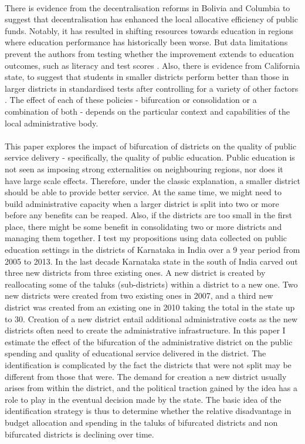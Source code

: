 \documentclass[12pt, a4paper]{article}
\begin{document}
\paragraph{} There is evidence from the decentralisation reforms in Bolivia and Columbia to suggest that decentralisation has enhanced the local allocative efficiency of public funds. Notably, it has resulted in shifting resources towards education in regions where education performance has historically been worse. But data limitations prevent the authors from testing whether the improvement extends to education outcomes, such as literacy and test scores \parencite{faguet2008decentralization}. Also, there is evidence from California state, to suggest that students in smaller districts perform better than those in larger districts in standardised tests after controlling for a variety of other factors \parencite{driscoll2003school}. The effect of each of these policies - bifurcation or consolidation or a combination of both - depends on the particular context and capabilities of the local administrative body. 
\paragraph{}This paper explores the impact of bifurcation of districts on the quality of public service delivery - specifically, the quality of public education. Public education is not seen as imposing strong externalities on neighbouring regions, nor does it have large scale effects. Therefore, under the classic explanation, a smaller district should be able to provide better service. At the same time, we might need to build administrative capacity when a larger district is split into two or more before any benefits can be reaped. Also, if the districts are too small in the first place, there might be some benefit in consolidating two or more districts and managing them together. I test my propositions using data collected on public education settings in the districts of Karnataka in India over a 9 year period from 2005 to 2013. In the last decade Karnataka state in the south of India carved out three new districts from three existing ones. A new district is created by reallocating some of the taluks (sub-districts) within a district to a new one. Two new districts were created from two existing ones in 2007, and a third new district was created from an existing one in 2010 taking the total in the state up to 30. Creation of a new district entail additional administrative costs as the new districts often need to create the administrative infrastructure. In this paper I estimate the effect of the bifurcation of the administrative district on the public spending and quality of educational service delivered in the district. The identification is complicated by the fact the districts that were not split may be different from those that were. The demand for creation a new district usually arises from within the district, and the political traction gained by the idea has a role to play in the eventual decision made by the state. The basic idea of the identification strategy is thus to determine whether the relative disadvantage in budget allocation and spending in the taluks of bifurcated districts and non bifurcated districts is declining over time.
	
\printbibliography
\end{document}
